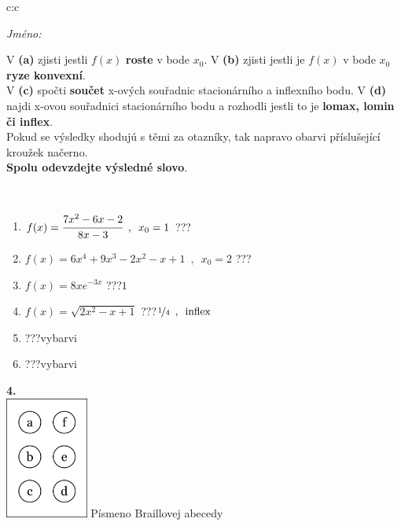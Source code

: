 \documentclass[10pt]{report}
\begin{document}
\begin{tabular}{c:c}
\begin{minipage}[c][104.5mm][t]{0.5\linewidth}
\begin{center}
\textit{Jméno:}\phantom{xxxxxxxxxxxxxxxxxxxxxxxxxxxxxxxxxxxxxxxxxxxxxxxxxxxxxxxxxxxxxxxxx}\\[5mm]
\begin{minipage}{0.95\linewidth}
\begin{center}
{\small V \textbf{(a)} zjisti jestli $f(x)$ \textbf{roste} v bode $x_0$. V \textbf{(b)} zjisti jestli je $f(x)$ v bode $x_0$ \textbf{ryze konvexní}.\\V \textbf{(c)} spočti \textbf{součet} x-ových souřadnic stacionárního a inflexního bodu. V \textbf{(d)} najdi x-ovou souřadnici stacionárního bodu a rozhodli jestli to je \textbf{lomax, lomin či inflex}.\\Pokud se výsledky shodujú s těmi za otazníky, tak napravo obarvi příslušející kroužek načerno.\\\textbf{Spolu odevzdejte výsledné slovo}}.
\end{center}
\end{minipage}
\\[1mm]
\begin{minipage}{0.79\linewidth}
\begin{center}
\begin{varwidth}{\linewidth}
\begin{enumerate}
\normalsize
\item $f(x)=\cfrac{7x^2-6x-2}{8x-3}\enspace , \enspace x_0=1$\quad \dotfill\; ???\;\dotfill \quad {}
\item $f(x)=6x^4+9x^3-2x^2-x+1\enspace , \enspace x_0=2$\quad \dotfill\; ???\;\dotfill \quad {}
\item $f(x)=8xe^{-3x}$\quad \dotfill\; ???\;\dotfill \quad $1$
\item $f(x)=\sqrt{2x^2-x+1}$\quad \dotfill\; ???\;\dotfill \quad $\nicefrac{1}{4}\enspace , \enspace\mathrm{inflex}$
\item \quad \dotfill\; ???\;\dotfill \quad vybarvi
\item \quad \dotfill\; ???\;\dotfill \quad vybarvi
\end{enumerate}
\end{varwidth}
\end{center}
\end{minipage}
\begin{minipage}{0.20\linewidth}
\begin{center}
{\Huge\bfseries 4.} \\[2mm]
\includegraphics[height=40mm]{../images/braille.png}
{\small Písmeno Braillovej abecedy}
\end{center}
\end{minipage}
\end{center}
\end{minipage}
%
\end{tabular}
\end{document}
